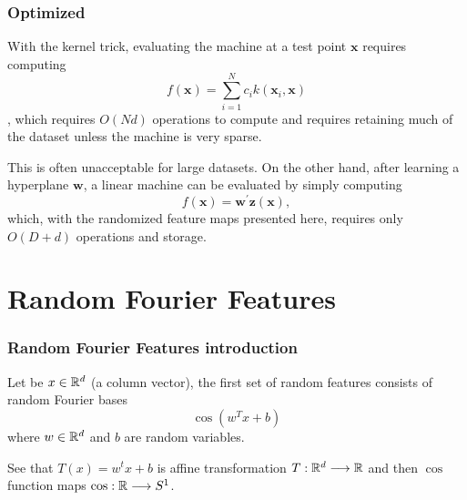 \begin{frame}
  \frametitle{Optimized}

  With the kernel trick, evaluating the machine at a test point $\mathbf{x}$ requires computing 
  \begin{equation}
    f(\mathbf{x}) = \sum_{i=1}^N c_i k(\mathbf{x}_i,\mathbf{x})
  \end{equation},
   which requires $O(Nd)$ operations to compute and requires retaining much of the dataset unless the machine is very sparse. 
   
   This is often unacceptable for large datasets. On the other hand, after learning a hyperplane $\mathbf{w}$, a linear machine can be evaluated by simply computing 
   \begin{equation}
    f(\mathbf{x}) = \mathbf{w}^\prime \mathbf{z}(\mathbf{x}),
   \end{equation} which, with the randomized feature maps presented here, requires only $O(D+d)$ operations and storage.

\end{frame}

\section{Random Fourier Features}

\begin{frame}
  \frametitle{Random Fourier Features introduction}

  
Let be $x \in \mathbb{R}^d$  (a column vector), the first set of random features consists of random 
Fourier bases
\begin{equation}
    \cos(w^T x + b) 
\end{equation}
where $w \in \mathbb{R}^d$  and $b$ are random variables. 

See that $T(x) = w^t x +b$ is affine transformation
$T:\mathbb{R}^d \longrightarrow \mathbb{R}$  and then $\cos$ function maps
$\cos: \mathbb{R}  \longrightarrow S^1$. 

\end{frame}

